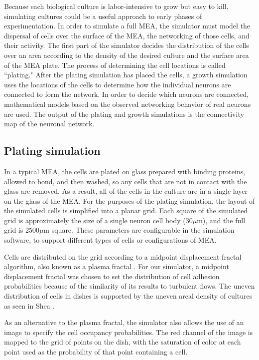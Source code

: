 \documentclass[letterpaper]{article}
\begin{document}
Because each biological culture is labor-intensive to grow but easy to kill, simulating cultures could be a useful approach to early phases of experimentation. 
In order to simulate a full MEA, the simulator must model the dispersal of cells over the surface of the MEA, the networking of those cells, and their activity. 
The first part of the simulator decides the distribution of the cells over an area according to the density of the desired culture and the surface area of the MEA plate. 
The process of determining the cell locations is called ``plating."
After the plating simulation has placed the cells, a growth simulation uses the locations of the cells to determine how the individual neurons are connected to form the network. 
In order to decide which neurons are connected, mathematical models based on the observed networking behavior of real neurons are used. 
The output of the plating and growth simulations is the connectivity map of the neuronal network. 

\subsection{Plating simulation}

In a typical MEA, the cells are plated on glass prepared with binding proteins, allowed to bond, and then washed, so any cells that are not in contact with the glass are removed.
As a result, all of the cells in the culture are in a single layer on the glass of the MEA.
For the purposes of the plating simulation, the layout of the simulated cells is simplified into a planar grid. 
Each square of the simulated grid is approximately the size of a single neuron cell body (30$\mu$m), and the full grid is 2500$\mu$m square.
These parameters are configurable in the simulation software, to support different types of cells or configurations of MEA.

Cells are distributed on the grid according to a midpoint displacement fractal algorithm, also known as a plasma fractal \cite{Fournier1982Stochastic}. 
For our simulator, a midpoint displacement fractal was chosen to set the distribution of cell adhesion probabilities because of the similarity of its results to turbulent flows. 
The uneven distribution of cells in dishes is supported by the uneven areal density of cultures as seen in Shea \citeyear{shea2009optimization}. 

As an alternative to the plasma fractal, the simulator also allows the use of an image to specify the cell occupancy probabilities. 
The red channel of the image is mapped to the grid of points on the dish, with the saturation of color at each point used as the probability of that point containing a cell. 
\end{document}
